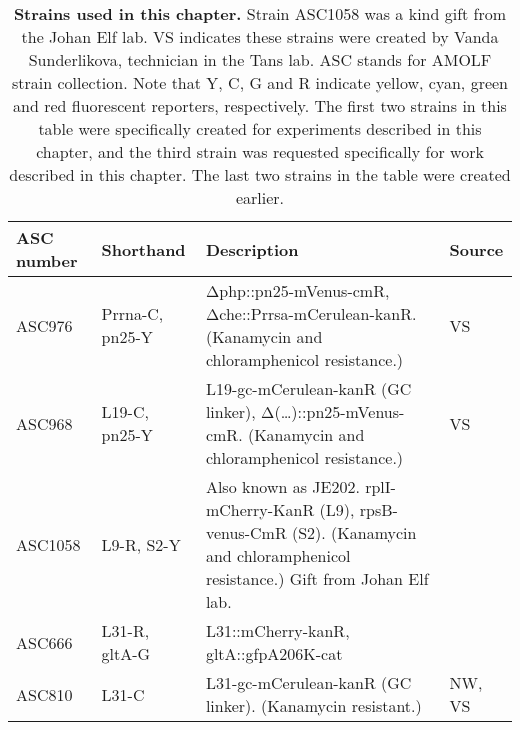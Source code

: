 \begin{table}[h]
    \begin{tabularx}{\textwidth}{llXl}
        \textbf{ASC number}	& \textbf{Shorthand} & \textbf{Description} & \textbf{Source}		\\
        \hline
        ASC976  &	Prrna-C, pn25-Y	&	Δphp::pn25-mVenus-cmR, Δche::Prrsa-mCerulean-kanR. (Kanamycin and chloramphenicol resistance.)  & VS \\
        ASC968	& L19-C, pn25-Y	& L19-gc-mCerulean-kanR (GC linker), Δ(…)::pn25-mVenus-cmR.	(Kanamycin and chloramphenicol resistance.)	& VS \\
        ASC1058	& L9-R, S2-Y	& Also known as JE202. rplI-mCherry-KanR (L9), rpsB-venus-CmR (S2). (Kanamycin and chloramphenicol resistance.) Gift from Johan Elf lab. & \cite{Wallden2016} \\
        \hline
        ASC666 & L31-R, gltA-G  & L31::mCherry-kanR, gltA::gfpA206K-cat & \cite{Kiviet2014} \\
        ASC810	& L31-C & L31-gc-mCerulean-kanR (GC linker). (Kanamycin resistant.) & NW, VS \\
        \hline
    \end{tabularx}
    \caption{\textbf{Strains used in this chapter.} Strain ASC1058 was a kind gift from the Johan Elf lab. VS indicates these strains were created by Vanda Sunderlikova, technician in the Tans lab. ASC stands for AMOLF strain collection. Note that Y, C, G and R indicate yellow, cyan, green and red fluorescent reporters, respectively. The first two strains in this table were specifically created for experiments described in this chapter, and the third strain was requested specifically for work described in this chapter. The last two strains in the table were created earlier.}
    \label{table:ribostrains1}
\end{table}

